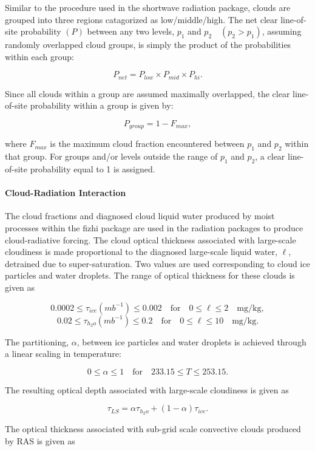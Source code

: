 Similar to the procedure used in the shortwave radiation package, clouds are grouped into
three regions catagorized as low/middle/high.
The net clear line-of-site probability $(P)$ between any two levels, $p_1$ and $p_2 \quad (p_2 > p_1)$,  
assuming randomly overlapped cloud groups, is simply the product of the probabilities within each group:

\[ P_{net} = P_{low} \times P_{mid} \times P_{hi} . \]

Since all clouds within a group are assumed maximally overlapped, the clear line-of-site probability within
a group is given by:

\[ P_{group} = 1 - F_{max} , \]

where $F_{max}$ is the maximum cloud fraction encountered between $p_1$ and $p_2$ within that group.
For groups and/or levels outside the range of $p_1$ and $p_2$, a clear line-of-site probability equal to 1 is
assigned.


\paragraph{Cloud-Radiation Interaction}
\label{sec:fizhi:radcloud}

The cloud fractions and diagnosed cloud liquid water produced by moist processes 
within the fizhi package are used in the radiation packages to produce cloud-radiative forcing.
The cloud optical thickness associated with large-scale cloudiness is made
proportional to the diagnosed large-scale liquid water, $\ell$, detrained due to super-saturation.
Two values are used corresponding to cloud ice particles and water droplets.
The range of optical thickness for these clouds is given as

\[ 0.0002 \le \tau_{ice} (mb^{-1}) \le 0.002  \quad\mbox{for}\quad  0 \le \ell \le 2 \quad\mbox{mg/kg} , \]
\[ 0.02 \le \tau_{h_2o} (mb^{-1}) \le 0.2  \quad\mbox{for}\quad  0 \le \ell \le 10 \quad\mbox{mg/kg} . \]

The partitioning, $\alpha$,  between ice particles and water droplets is achieved through a linear scaling
in temperature:

\[ 0 \le \alpha \le 1 \quad\mbox{for}\quad  233.15 \le T \le 253.15 . \]

The resulting optical depth associated with large-scale cloudiness is given as

\[ \tau_{LS} = \alpha \tau_{h_2o} + (1-\alpha)\tau_{ice} . \]

The optical thickness associated with sub-grid scale convective clouds produced by RAS is given as

